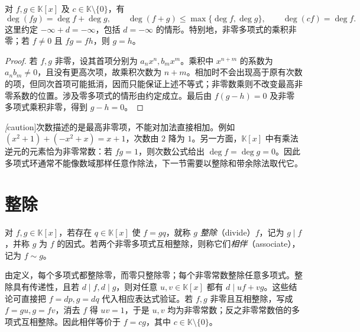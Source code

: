 \begin{proposition}
\label{prop:polynomial-degree}
对 $f,g\in\mathbb K[x]$ 及 $c\in\mathbb K\setminus\{0\}$，有
\[
    \deg(fg)=\deg f+\deg g,\qquad
    \deg(f+g)\leq\max\{\deg f,\deg g\},\qquad
    \deg(cf)=\deg f.
\]
这里约定 $-\infty+d=-\infty$，包括 $d=-\infty$ 的情形。特别地，非零多项式的乘积非零；若 $f\ne0$ 且 $fg=fh$，则 $g=h$。
\end{proposition}
\begin{proof}
若 $f,g$ 非零，设其首项分别为 $a_nx^n,b_mx^m$。乘积中 $x^{n+m}$ 的系数为 $a_nb_m\ne0$，且没有更高次项，故乘积次数为 $n+m$。相加时不会出现高于原有次数的项，但同次首项可能抵消，因而只能保证上述不等式；非零数乘则不改变最高非零系数的位置。涉及零多项式的情形由约定成立。最后由 $f(g-h)=0$ 及非零多项式乘积非零，得到 $g-h=0$。
\end{proof}

\emph[caution]{次数描述的是最高非零项，不能对加法直接相加。}例如 $(x^2+1)+(-x^2+x)=x+1$，次数由 $2$ 降为 $1$。另一方面，$\mathbb K[x]$ 中有乘法逆元的元素恰为非零常数：若 $fg=1$，则次数公式给出 $\deg f=\deg g=0$。因此多项式环通常不能像数域那样任意作除法，下一节需要以整除和带余除法取代它。

\section{整除}
\label{sec:polynomial-divisibility}

\begin{definition}
对 $f,g\in\mathbb K[x]$，若存在 $q\in\mathbb K[x]$ 使 $f=gq$，就称 $g$ \emph{整除}（divide）$f$，记为 $g\mid f$，并称 $g$ 为 $f$ 的因式。若两个非零多项式互相整除，则称它们\emph{相伴}（associate），记为 $f\sim g$。
\end{definition}

由定义，每个多项式都整除零，而零只整除零；每个非零常数整除任意多项式。整除具有传递性，且若 $d\mid f,d\mid g$，则对任意 $u,v\in\mathbb K[x]$ 都有 $d\mid uf+vg$。这些结论可直接把 $f=dp,g=dq$ 代入相应表达式验证。若 $f,g$ 非零且互相整除，写成 $f=gu,g=fv$，消去 $f$ 得 $uv=1$，于是 $u,v$ 均为非零常数；反之非零常数倍的多项式互相整除。因此相伴等价于 $f=cg$，其中 $c\in\mathbb K\setminus\{0\}$。

